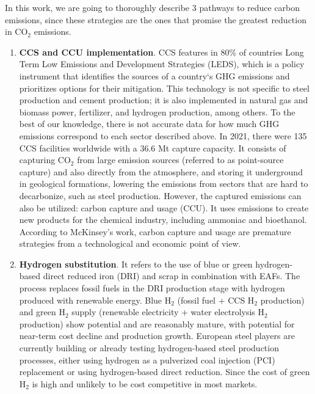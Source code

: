 In this work, we are going to thoroughly describe 3 pathways to reduce carbon emissions, since these strategies are the ones that promise the greatest reduction in CO$_2$ emissions.\autocite{elkerbout2021impact}

\begin{enumerate}
\item \textbf{CCS and CCU implementation}. CCS features in 80\% of countries Long Term Low Emissions and Development Strategies (LEDS), which is a policy instrument that identifies the sources of a country‘s GHG emissions and prioritizes options for their mitigation.\autocite{clapp2010low} This technology is not specific to steel production and cement production; it is also implemented in natural gas and biomass power, fertilizer, and hydrogen production, among others. To the best of our knowledge, there is not accurate data for how much GHG emissions correspond to each sector described above. In 2021, there were 135 CCS facilities worldwide with a 36.6 Mt capture capacity.\autocite{global2021institute}  It consists of capturing CO$_2$ from large emission sources (referred to as point-source capture) and also directly from the atmosphere, and storing it underground in geological formations, lowering the emissions from sectors that are hard to decarbonize, such as steel production.\autocite{portner2022climate} However, the captured emissions can also be utilized: carbon capture and usage (CCU). It uses emissions to create new products for the chemical industry, including ammoniac and bioethanol. According to McKinsey's work,\autocite{hoffmann2021decarbonization} carbon capture and usage are premature strategies from a technological and economic point of view.
\item \textbf{Hydrogen substitution}. It refers to the use of blue or green hydrogen-based direct reduced iron (DRI) and scrap in combination with EAFs. The process replaces fossil fuels in the DRI production stage with hydrogen produced with renewable energy.\autocite{hoffmann2021decarbonization} Blue H$_2$ (fossil fuel + CCS H$_2$ production) and green H$_2$ supply (renewable electricity + water electrolysis H$_2$ production) show potential and are reasonably mature, with potential for near-term cost decline and production growth.\autocite{henderson2020blue}  European steel players are currently building or already testing hydrogen-based steel production processes, either using hydrogen as a pulverized coal injection (PCI) replacement or using hydrogen-based direct reduction.\autocite{hoffmann2021decarbonization} Since the cost of green H$_2$ is high and unlikely to be cost competitive in most markets.\autocite{fan2021low} 

\end{enumerate}
